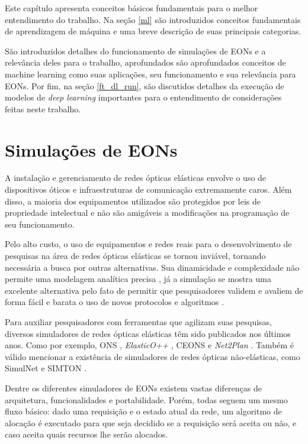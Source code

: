 Este capítulo apresenta conceitos básicos fundamentais para o melhor entendimento do trabalho. Na seção \ref{ml} são introduzidos conceitos fundamentais de aprendizagem de máquina e uma breve descrição de suas principais categorias.

São introduzidos detalhes do funcionamento de simulações de EONs e a relevância deles para o trabalho, aprofundados são aprofundados conceitos de machine learning como suas aplicações, seu funcionamento e sua relevância para EONs. Por fim, na seção \ref{ft_dl_run}, são discutidos detalhes da execução de modelos de \textit{deep learning} importantes para o entendimento de considerações feitas neste trabalho.

\section{Simulações de EONs}%
\label{ft_eon}

A instalação e gerenciamento de redes ópticas elásticas envolve o uso de dispositivos óticos e infraestruturas de comunicação extremamente caros. Além disso, a maioria dos equipamentos utilizados são protegidos por leis de propriedade intelectual e não são amigáveis a modificações na programação de seu funcionamento.

Pelo alto custo, o uso de equipamentos e redes reais para o desenvolvimento de pesquisas na área de redes ópticas elásticas se tornou inviável, tornando necessária a busca por outras alternativas. Sua dinamicidade e complexidade não permite uma modelagem analítica precisa \cite{costa2016ons}, já a simulação se mostra uma excelente alternativa pelo fato de permitir que pesquisadores validem e avaliem de forma fácil e barata o uso de novos protocolos e algoritmos \cite{simulnet2009}.

Para auxiliar pesquisadores com ferramentas que agilizam suas pesquisas, diversos simuladores de redes ópticas elásticas têm sido publicados nos últimos anos. Como por exemplo, \acrfull{ONS} \cite{costa2016ons}, \textit{ElasticO++} \cite{TESSINARI201695}, \acrfull{CEONS} \cite{ceons2015} e \textit{Net2Plan} \cite{net2plan}. Também é válido mencionar a existência de simuladores de redes ópticas não-elásticas, como SimulNet \cite{simulnet2009} e SIMTON \cite{chaves2010}.

Dentre os diferentes simuladores de EONs existem vastas diferenças de arquitetura, funcionalidades e portabilidade. Porém, todas seguem um mesmo fluxo básico: dado uma requisição e o estado atual da rede, um algoritmo de alocação é executado para que seja decidido se a requisição será aceita ou não, e caso aceita quais recursos lhe serão alocados.

